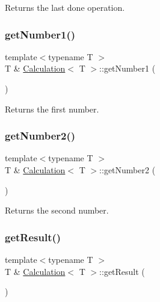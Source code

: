 Returns the last done operation. 

\mbox{\label{class_calculation_af094cbf10d94708d842e92eb290719ab}} 
\subsubsection{\texorpdfstring{get\+Number1()}{getNumber1()}}
{\footnotesize\ttfamily template$<$typename T $>$ \\
T \& \mbox{\hyperlink{class_calculation}{Calculation}}$<$ T $>$\+::get\+Number1 (\begin{DoxyParamCaption}{ }\end{DoxyParamCaption})}



Returns the first number. 

\mbox{\label{class_calculation_a678dfb83b5746a5c882107081726b605}} 
\subsubsection{\texorpdfstring{get\+Number2()}{getNumber2()}}
{\footnotesize\ttfamily template$<$typename T $>$ \\
T \& \mbox{\hyperlink{class_calculation}{Calculation}}$<$ T $>$\+::get\+Number2 (\begin{DoxyParamCaption}{ }\end{DoxyParamCaption})}



Returns the second number. 

\mbox{\label{class_calculation_ada3a3ff5f33f3c2b6eba7d076d2ada5b}} 
\subsubsection{\texorpdfstring{get\+Result()}{getResult()}}
{\footnotesize\ttfamily template$<$typename T $>$ \\
T \& \mbox{\hyperlink{class_calculation}{Calculation}}$<$ T $>$\+::get\+Result (\begin{DoxyParamCaption}{ }\end{DoxyParamCaption})}



